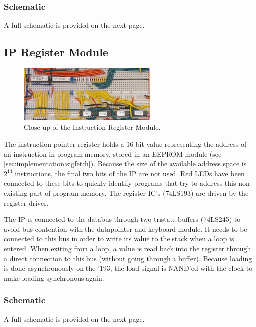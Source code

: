 \subsubsection{Schematic}
A full schematic is provided on the next page.



\subsection{IP Register Module}
\begin{figure}[H]
  \centering
  \includegraphics[width=0.6\textwidth]{img/ipregistercloseup}
  \caption{Close up of the Instruction Register Module.}
  \label{fig:iregcloseup}
\end{figure}

The instruction pointer register holds a 16-bit value representing the address of an instruction in program-memory, stored in an EEPROM module (see \ref{sec:implementation:sigfetch}). Because the size of the available address space is $2^{14}$ instructions, the final two bits of the IP are not used. Red LEDs have been connected to these bits to quickly identify programs that try to address this non-existing part of program memory. The register IC's (74LS193) are driven by the register driver.

The IP is connected to the databus through two tristate buffers (74LS245) to avoid bus contention with the datapointer and keyboard module. It needs to be connected to this bus in order to write its value to the stack when a loop is entered. When exiting from a loop, a value is read back into the register through a direct connection to this bus (without going through a buffer). Because loading is done asynchronously on the '193, the load signal is NAND'ed with the clock to make loading synchronous again.

\subsubsection{Schematic}
A full schematic is provided on the next page.


